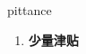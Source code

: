 
\begin{frame}
{\huge pittance}
\begin{center}
\begin{enumerate}\Large
  \item \textbf{少量津贴}
\end{enumerate}
\end{center}
\end{frame}

